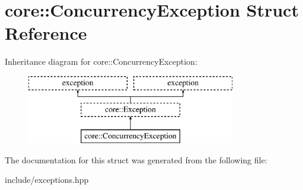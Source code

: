 \hypertarget{structcore_1_1_concurrency_exception}{\section{core\-:\-:Concurrency\-Exception Struct Reference}
\label{structcore_1_1_concurrency_exception}
}
Inheritance diagram for core\-:\-:Concurrency\-Exception\-:\begin{figure}[H]
\begin{center}
\leavevmode
\includegraphics[height=3.000000cm]{structcore_1_1_concurrency_exception}
\end{center}
\end{figure}


The documentation for this struct was generated from the following file\-:\begin{DoxyCompactItemize}
\item 
include/exceptions.\-hpp\end{DoxyCompactItemize}
